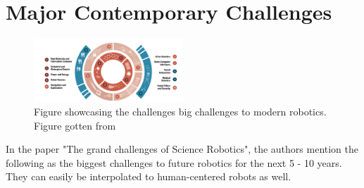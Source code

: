 \documentclass[conference]{IEEEtran}
\begin{document}
\section{Major Contemporary Challenges}
\begin{figure}
    \centerline{\includegraphics[width=0.5\textwidth]{images/grand_challenges.png}}
    \caption{Figure showcasing the challenges big challenges to modern robotics. Figure gotten from\autocite{yang2018grand}}
\label{fig3}
\end{figure}
In the paper "The grand challenges of Science Robotics", the authors \textcite{yang2018grand} mention the following as the biggest challenges to future robotics for the next 5 - 10 years. They can easily be interpolated to human-centered robots as well.
\end{document}

